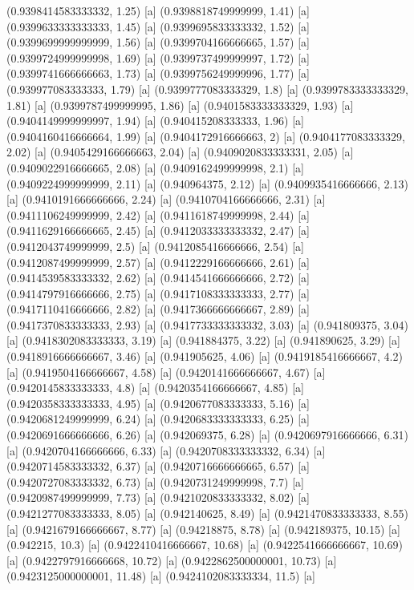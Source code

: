{{{(0.9398414583333332, 1.25) [a] 
(0.9398818749999999, 1.41) [a] 
(0.9399633333333333, 1.45) [a] 
(0.9399695833333332, 1.52) [a] 
(0.9399699999999999, 1.56) [a] 
(0.9399704166666665, 1.57) [a] 
(0.9399724999999998, 1.69) [a] 
(0.9399737499999997, 1.72) [a] 
(0.9399741666666663, 1.73) [a] 
(0.9399756249999996, 1.77) [a] 
(0.939977083333333, 1.79) [a] 
(0.9399777083333329, 1.8) [a] 
(0.9399783333333329, 1.81) [a] 
(0.9399787499999995, 1.86) [a] 
(0.9401583333333329, 1.93) [a] 
(0.9404149999999997, 1.94) [a] 
(0.940415208333333, 1.96) [a] 
(0.9404160416666664, 1.99) [a] 
(0.9404172916666663, 2) [a] 
(0.9404177083333329, 2.02) [a] 
(0.9405429166666663, 2.04) [a] 
(0.9409020833333331, 2.05) [a] 
(0.9409022916666665, 2.08) [a] 
(0.9409162499999998, 2.1) [a] 
(0.9409224999999999, 2.11) [a] 
(0.940964375, 2.12) [a] 
(0.9409935416666666, 2.13) [a] 
(0.9410191666666666, 2.24) [a] 
(0.9410704166666666, 2.31) [a] 
(0.9411106249999999, 2.42) [a] 
(0.9411618749999998, 2.44) [a] 
(0.9411629166666665, 2.45) [a] 
(0.9412033333333332, 2.47) [a] 
(0.9412043749999999, 2.5) [a] 
(0.9412085416666666, 2.54) [a] 
(0.9412087499999999, 2.57) [a] 
(0.9412229166666666, 2.61) [a] 
(0.9414539583333332, 2.62) [a] 
(0.9414541666666666, 2.72) [a] 
(0.9414797916666666, 2.75) [a] 
(0.9417108333333333, 2.77) [a] 
(0.9417110416666666, 2.82) [a] 
(0.9417366666666667, 2.89) [a] 
(0.9417370833333333, 2.93) [a] 
(0.9417733333333332, 3.03) [a] 
(0.941809375, 3.04) [a] 
(0.9418302083333333, 3.19) [a] 
(0.941884375, 3.22) [a] 
(0.941890625, 3.29) [a] 
(0.9418916666666667, 3.46) [a] 
(0.941905625, 4.06) [a] 
(0.9419185416666667, 4.2) [a] 
(0.9419504166666667, 4.58) [a] 
(0.9420141666666667, 4.67) [a] 
(0.9420145833333333, 4.8) [a] 
(0.9420354166666667, 4.85) [a] 
(0.9420358333333333, 4.95) [a] 
(0.9420677083333333, 5.16) [a] 
(0.9420681249999999, 6.24) [a] 
(0.9420683333333333, 6.25) [a] 
(0.9420691666666666, 6.26) [a] 
(0.942069375, 6.28) [a] 
(0.9420697916666666, 6.31) [a] 
(0.9420704166666666, 6.33) [a] 
(0.9420708333333332, 6.34) [a] 
(0.9420714583333332, 6.37) [a] 
(0.9420716666666665, 6.57) [a] 
(0.9420727083333332, 6.73) [a] 
(0.9420731249999998, 7.7) [a] 
(0.9420987499999999, 7.73) [a] 
(0.9421020833333332, 8.02) [a] 
(0.9421277083333333, 8.05) [a] 
(0.942140625, 8.49) [a] 
(0.9421470833333333, 8.55) [a] 
(0.9421679166666667, 8.77) [a] 
(0.94218875, 8.78) [a] 
(0.942189375, 10.15) [a] 
(0.942215, 10.3) [a] 
(0.9422410416666667, 10.68) [a] 
(0.9422541666666667, 10.69) [a] 
(0.9422797916666668, 10.72) [a] 
(0.9422862500000001, 10.73) [a] 
(0.9423125000000001, 11.48) [a] 
(0.9424102083333334, 11.5) [a] 
}}}

